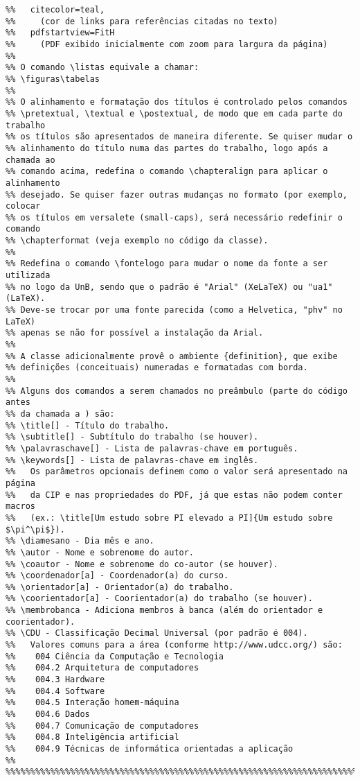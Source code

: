 \begin{verbatim}
%%   citecolor=teal,
%%	   (cor de links para referências citadas no texto)
%%   pdfstartview=FitH
%%	   (PDF exibido inicialmente com zoom para largura da página)
%%
%% O comando \listas equivale a chamar:
%% \figuras\tabelas
%%
%% O alinhamento e formatação dos títulos é controlado pelos comandos
%% \pretextual, \textual e \postextual, de modo que em cada parte do trabalho
%% os títulos são apresentados de maneira diferente. Se quiser mudar o
%% alinhamento do título numa das partes do trabalho, logo após a chamada ao
%% comando acima, redefina o comando \chapteralign para aplicar o alinhamento
%% desejado. Se quiser fazer outras mudanças no formato (por exemplo, colocar
%% os títulos em versalete (small-caps), será necessário redefinir o comando
%% \chapterformat (veja exemplo no código da classe).
%%
%% Redefina o comando \fontelogo para mudar o nome da fonte a ser utilizada
%% no logo da UnB, sendo que o padrão é "Arial" (XeLaTeX) ou "ua1" (LaTeX).
%% Deve-se trocar por uma fonte parecida (como a Helvetica, "phv" no LaTeX)
%% apenas se não for possível a instalação da Arial.
%%
%% A classe adicionalmente provê o ambiente {definition}, que exibe
%% definições (conceituais) numeradas e formatadas com borda.
%%
%% Alguns dos comandos a serem chamados no preâmbulo (parte do código antes
%% da chamada a ) são:
%% \title[] - Título do trabalho.
%% \subtitle[] - Subtítulo do trabalho (se houver).
%% \palavraschave[] - Lista de palavras-chave em português.
%% \keywords[] - Lista de palavras-chave em inglês.
%%   Os parâmetros opcionais definem como o valor será apresentado na página
%%   da CIP e nas propriedades do PDF, já que estas não podem conter macros
%%   (ex.: \title[Um estudo sobre PI elevado a PI]{Um estudo sobre $\pi^\pi$}).
%% \diamesano - Dia mês e ano.
%% \autor - Nome e sobrenome do autor.
%% \coautor - Nome e sobrenome do co-autor (se houver).
%% \coordenador[a] - Coordenador(a) do curso.
%% \orientador[a] - Orientador(a) do trabalho.
%% \coorientador[a] - Coorientador(a) do trabalho (se houver).
%% \membrobanca - Adiciona membros à banca (além do orientador e coorientador).
%% \CDU - Classificação Decimal Universal (por padrão é 004).
%%   Valores comuns para a área (conforme http://www.udcc.org/) são:
%%    004 Ciência da Computação e Tecnologia
%%    004.2	Arquitetura de computadores
%%    004.3	Hardware
%%    004.4	Software
%%    004.5	Interação homem-máquina
%%    004.6	Dados
%%    004.7	Comunicação de computadores
%%    004.8	Inteligência artificial
%%    004.9	Técnicas de informática orientadas a aplicação
%%
%%%%%%%%%%%%%%%%%%%%%%%%%%%%%%%%%%%%%%%%%%%%%%%%%%%%%%%%%%%%%%%%%%%%%%%%%%%%%%%

\end{verbatim}
